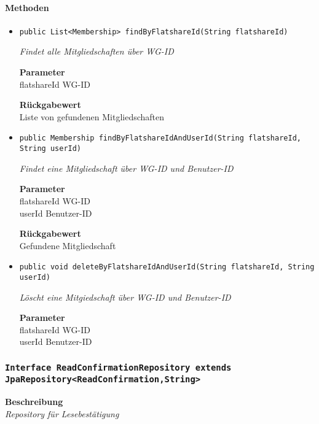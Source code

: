      \paragraph*{Methoden}
     \begin{itemize}
     	\item{\texttt{public List<Membership> findByFlatshareId(String flatshareId)}}
     	
     	\textit{Findet alle Mitgliedschaften über WG-ID}
     	
     	\textbf{Parameter} \\
     	flatshareId WG-ID
     	
     	\textbf{Rückgabewert} \\
     	Liste von gefundenen Mitgliedschaften        \item{\texttt{public Membership findByFlatshareIdAndUserId(String flatshareId, String userId)}}
     	
     	\textit{Findet eine Mitgliedschaft über WG-ID und Benutzer-ID}
     	
     	\textbf{Parameter} \\
     	flatshareId WG-ID\\
     	userId Benutzer-ID
     	
     	\textbf{Rückgabewert} \\
     	Gefundene Mitgliedschaft        \item{\texttt{public void deleteByFlatshareIdAndUserId(String flatshareId, String userId)}}
     	
     	\textit{Löscht eine Mitgiedschaft über WG-ID und Benutzer-ID}
     	
     	\textbf{Parameter} \\
     	flatshareId WG-ID\\
     	userId Benutzer-ID
     	
     	
     \end{itemize}
     \subsubsection{\texttt{Interface ReadConfirmationRepository extends JpaRepository<ReadConfirmation,String>}}
     \textbf{Beschreibung} \\
     \textit{Repository für Lesebestätigung}
